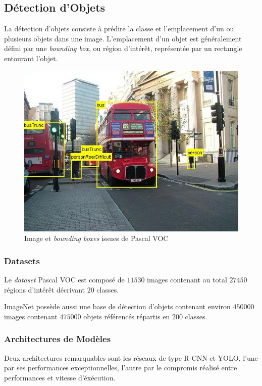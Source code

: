 \documentclass[a4paper, 10pt]{report}
\begin{document}
\subsection{Détection d'Objets}
La détection d'objets consiste à prédire la classe et l'emplacement d'un ou plusieurs objets dans une image. L'emplacement d'un objet est généralement défini par une \emph{bounding box}, ou région d'intérêt, représentée par un rectangle entourant l'objet.
\begin{figure}[H]
	\begin{center}
		\includegraphics[scale=0.3]{Images/Pascal_VOC_Detection.jpg}
		\caption{Image et \emph{bounding boxes} issues de Pascal VOC}
	\end{center}
\end{figure}

\subsubsection{Datasets}
Le \emph{dataset} Pascal VOC est composé de $11530$ images contenant au total $27450$ régions d'intérêt décrivant $20$ classes.

ImageNet possède aussi une base de détection d'objets contenant environ $450000$ images contenant $475000$ objets référencés répartis en $200$ classes.
\subsubsection{Architectures de Modèles}
Deux architectures remarquables sont les réseaux de type R-CNN et YOLO, l'une par ses performances exceptionnelles, l'autre par le compromis réalisé entre performances et vitesse d'éxécution.
\end{document}
